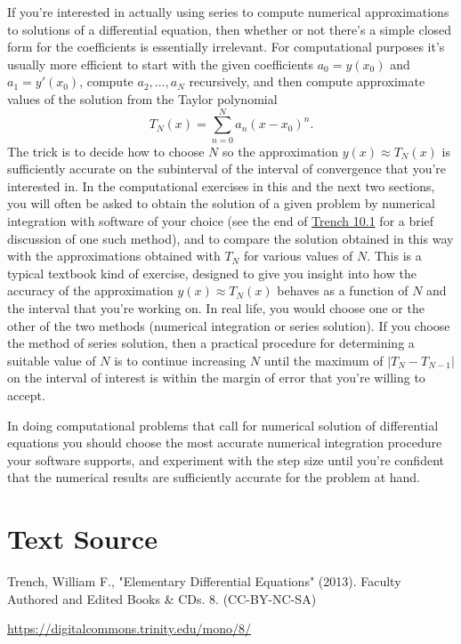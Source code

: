 \documentclass{ximera}
\begin{document}
If you're interested in actually using series to compute numerical
approximations to solutions of a differential equation, then whether
or not there's a simple closed form for the coefficients is
essentially irrelevant. For computational purposes it's usually
more efficient to start with the given coefficients $a_0=y(x_0)$ and
$a_1=y'(x_0)$, compute $a_2, \dots, a_N$ recursively,
 and then compute approximate values of the solution from the
Taylor polynomial
$$
T_N(x)=\sum_{n=0}^Na_n(x-x_0)^n.
$$
The trick is to decide how to choose $N$ so the approximation
$y(x)\approx T_N(x)$ is sufficiently accurate on the subinterval of
the interval of convergence that you're interested in. In the
computational exercises in this  and the next two sections,
you will often be asked to obtain the solution of a given problem by
numerical integration with  software  of your choice (see
the end of \href{https://ximera.osu.edu/ode/main/introToSystems/introToSystems}{Trench 10.1} 
for a brief discussion of one such method),
and to compare the solution obtained in this way with the
approximations obtained with $T_N$ for various values of $N$. This is
a typical textbook kind of exercise, designed to give you insight into
how the accuracy of the approximation $y(x)\approx T_N(x)$ behaves as
a function of $N$ and the interval that you're working on. In real
life, you would choose one or the other of the two methods (numerical
integration or series solution). If you choose the method of series
solution, then a practical procedure for determining a suitable value
of $N$ is to continue increasing $N$ until the maximum of
$|T_N-T_{N-1}|$ on the interval of interest is within the margin of
error that you're willing to accept.

In doing computational problems  that call for
numerical solution of differential equations you should
choose the most accurate numerical integration procedure your
software supports, and experiment with the step size until
you're confident that the numerical results are sufficiently
accurate for the problem at hand.




\section*{Text Source}
Trench, William F., "Elementary Differential Equations" (2013). Faculty Authored and Edited Books \& CDs. 8. (CC-BY-NC-SA)

\href{https://digitalcommons.trinity.edu/mono/8/}{https://digitalcommons.trinity.edu/mono/8/}
\end{document}

